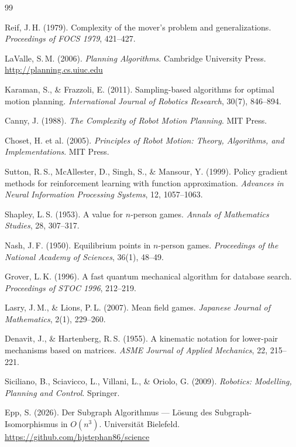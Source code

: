 ﻿\documentclass[a4paper,12pt]{article}
\theoremstyle{definition}
\begin{document}
\begin{thebibliography}{99}

Reif, J.\,H. (1979).
Complexity of the mover's problem and generalizations.
\textit{Proceedings of FOCS 1979}, 421--427.

LaValle, S.\,M. (2006).
\textit{Planning Algorithms}.
Cambridge University Press.
\url{http://planning.cs.uiuc.edu}

Karaman, S., \& Frazzoli, E. (2011).
Sampling-based algorithms for optimal motion planning.
\textit{International Journal of Robotics Research}, 30(7), 846--894.

Canny, J. (1988).
\textit{The Complexity of Robot Motion Planning}.
MIT Press.

Choset, H. et al. (2005).
\textit{Principles of Robot Motion: Theory, Algorithms, and Implementations}.
MIT Press.

Sutton, R.\,S., McAllester, D., Singh, S., \& Mansour, Y. (1999).
Policy gradient methods for reinforcement learning with function approximation.
\textit{Advances in Neural Information Processing Systems}, 12, 1057--1063.

Shapley, L.\,S. (1953).
A value for $n$-person games.
\textit{Annals of Mathematics Studies}, 28, 307--317.

Nash, J.\,F. (1950).
Equilibrium points in $n$-person games.
\textit{Proceedings of the National Academy of Sciences}, 36(1), 48--49.

Grover, L.\,K. (1996).
A fast quantum mechanical algorithm for database search.
\textit{Proceedings of STOC 1996}, 212--219.

Lasry, J.\,M., \& Lions, P.\,L. (2007).
Mean field games.
\textit{Japanese Journal of Mathematics}, 2(1), 229--260.

Denavit, J., \& Hartenberg, R.\,S. (1955).
A kinematic notation for lower-pair mechanisms based on matrices.
\textit{ASME Journal of Applied Mechanics}, 22, 215--221.

Siciliano, B., Sciavicco, L., Villani, L., \& Oriolo, G. (2009).
\textit{Robotics: Modelling, Planning and Control}.
Springer.

Epp, S. (2026).
Der Subgraph Algorithmus --- L\"osung des Subgraph-Isomorphismus in $O(n^3)$.
Universit\"at Bielefeld.
\url{https://github.com/hjstephan86/science}


\end{thebibliography}
\end{document}
